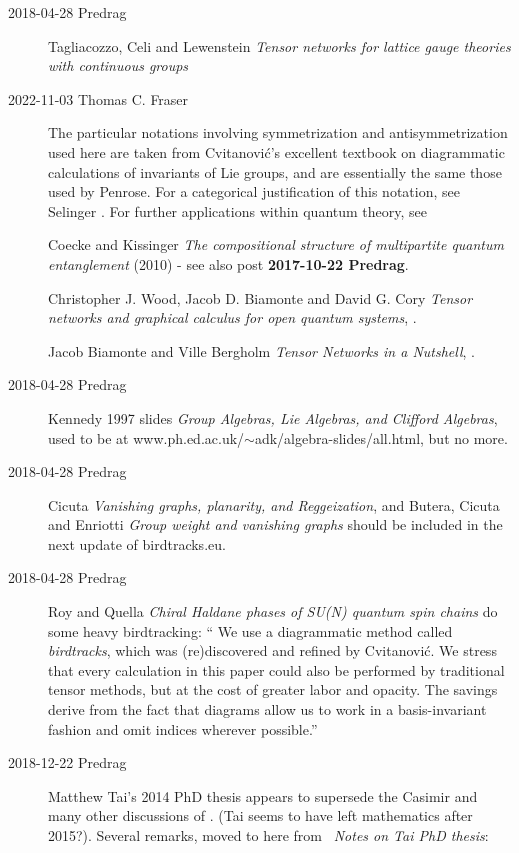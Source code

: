 \begin{description}
   \item[2018-04-28 Predrag]
Tagliacozzo, Celi and Lewenstein
{\em Tensor networks for lattice gauge theories with continuous groups}

\item[2022-11-03 Thomas C. Fraser]
The particular notations involving symmetrization and antisymmetrization used
here are taken from Cvitanovi{\'c}'s excellent textbook on diagrammatic
calculations of invariants of Lie groups, and are essentially the same those
used by Penrose. For a categorical justification of this
notation, see Selinger . For further applications within quantum theory, see

Coecke and Kissinger
{\em The compositional structure of multipartite quantum entanglement}
(2010) - see also post {\bf 2017-10-22 Predrag}.

Christopher J. Wood, Jacob D. Biamonte and David G. Cory
{\em Tensor networks and graphical calculus for open quantum systems},
.

Jacob Biamonte and Ville Bergholm
{\em Tensor Networks in a Nutshell},
.


\item[2018-04-28 Predrag]
Kennedy 1997 slides
{\em Group Algebras, {Lie} Algebras, and {Clifford} Algebras},
used to be at www.ph.ed.ac.uk/$\sim$adk/algebra-slides/all.html, but no more.

\item[2018-04-28 Predrag]
Cicuta {\em Vanishing graphs, planarity, and {Reggeization}},
and
Butera, Cicuta and Enriotti {\em Group weight and vanishing graphs}
should be included in the next update of birdtracks.eu.

\item[2018-04-28 Predrag]
Roy and Quella
{\em Chiral Haldane phases of {SU}(N) quantum spin chains}
do some heavy birdtracking: ``
We  use  a  diagrammatic  method  called \emph{birdtracks},  which
was (re)discovered and refined by Cvitanovi{\'c}. We stress
that every calculation in this paper could also be performed
by traditional tensor methods, but at the cost of greater labor
and opacity. The savings derive from the fact that diagrams
allow us to work in a basis-invariant fashion and omit indices
wherever possible.''

\item[2018-12-22 Predrag]
{Matthew Tai}'s 2014 PhD thesis
appears to supersede the Casimir and many other discussions of {\wwwgt}.
(Tai seems to have left mathematics after 2015?).
Several remarks,  moved to here from
~{\em Notes on Tai PhD thesis}:


\end{description}
